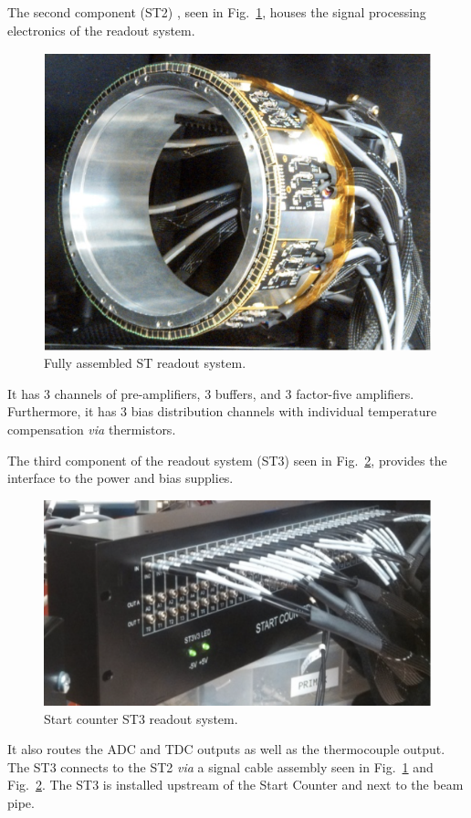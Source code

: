 The second component (ST2) , seen in Fig.~\ref{fig:stfullreadout}, houses the signal processing electronics of the readout system.  
	\begin{figure}[!htb]
		\centering
		\includegraphics[width=1.0\columnwidth]{design/figs/st_full_readout}
		\caption{Fully assembled ST readout system.}
		\label{fig:stfullreadout}
	\end{figure}
It has 3 channels of pre-amplifiers, 3 buffers, and 3 factor-five amplifiers.  Furthermore, it has 3 bias distribution channels with individual temperature compensation \emph{via} thermistors. 

The third component of the readout system (ST3) seen in Fig.~\ref{fig:st3}, provides the interface to the power and bias supplies.
	\begin{figure}[!htb]
		\centering
		\includegraphics[width=1.0\columnwidth]{design/figs/st3}
		\caption{Start counter ST3 readout system.}
		\label{fig:st3}
	\end{figure}
It also routes the ADC and TDC outputs as well as the thermocouple output.  The ST3 connects to the ST2 \emph{via} a signal cable assembly seen in Fig.~\ref{fig:stfullreadout} and Fig.~\ref{fig:st3}.  The ST3 is installed upstream of the Start Counter and next to the beam pipe.

%
